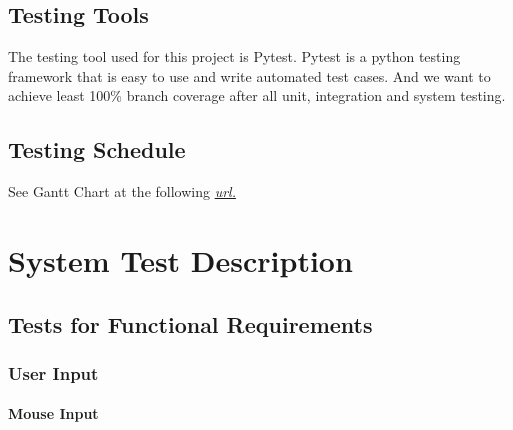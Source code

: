 \documentclass[12pt, titlepage]{article}
\begin{document}
\subsection{Testing Tools}
The testing tool used for this project is Pytest. Pytest is a python testing framework that is easy to use and write automated test cases. And we want to achieve least 100\% branch coverage after all unit, integration and system testing.

\subsection{Testing Schedule}
		
See Gantt Chart at the following 
\href{https://gitlab.cas.mcmaster.ca/se_3xa3_l3g15/se_3xa3_project/-/tree/master/ProjectSchedule/GanttT-Rex.gan}{\textit{url.}}

\section{System Test Description}
	
\subsection{Tests for Functional Requirements}

\subsubsection{User Input}

\paragraph{Mouse Input}
\end{document}

